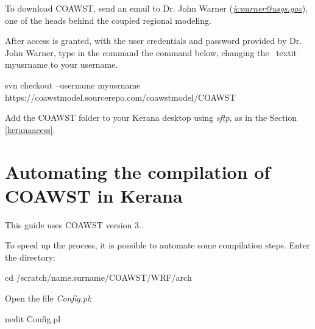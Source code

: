 \noindent To download COAWST, send an email to Dr. John Warner (\textcolor{bleu_cite}{\href{jcwarner@usgs.gov}{\textit{jcwarner@usgs.gov}}}), one of the heads behind the coupled regional modeling.
\bigskip

\noindent After access is granted, with the user credentials and password provided by Dr. John Warner, type in the command the command below, changing the \ textit {myusrname} to your username.
\bigskip

\begin{bashcode}[fontsize=\footnotesize]
svn checkout --username myusrname https://coawstmodel.sourcerepo.com/coawstmodel/COAWST
\end{bashcode}
\bigskip

\noindent Add the COAWST folder to your Kerana desktop using \textit{sftp}, as in the Section \textcolor{bleu_cite}{\ref{keranaacess}}.
\bigskip

\section{Automating the compilation of COAWST in Kerana}\label{autowrf}
\bigskip

\begin{tcolorbox}[enhanced,
  grow to left by=0cm,%
  grow to right by=0cm,%
  enlarge top by=0cm,%
  enlarge bottom by=0cm,%
  tcbox raise base,
  boxrule=1.0pt,
  left=18mm,
  colframe=red!50!black,coltext=red!25!black,colback=red!10!white,
  overlay={\begin{tcbclipinterior}\fill[red!75!blue!50!white] (frame.south west)
    rectangle node[text=white,font=\sffamily\bfseries\footnotesize,rotate=0] {WARNING} ([xshift=18mm]frame.north west);\end{tcbclipinterior}}]
  This guide uses COAWST version 3..
\end{tcolorbox}
\bigskip

\noindent To speed up the process, it is possible to automate some compilation steps. Enter the directory:
\bigskip

\begin{bashcode}
cd /scratch/name.surname/COAWST/WRF/arch
\end{bashcode}
\bigskip

\noindent Open the file \textit{Config.pl}:
\bigskip

\begin{bashcode}
nedit Config.pl
\end{bashcode}
\bigskip

